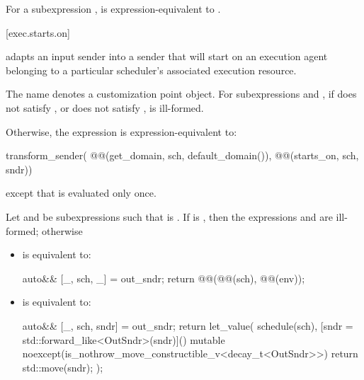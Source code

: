 \pnum
For a subexpression ,
 is expression-equivalent to
.

[exec.starts.on]{}

\pnum
{} adapts an input sender into a sender
that will start on an execution agent belonging to
a particular scheduler's associated execution resource.

\pnum
The name  denotes a customization point object.
For subexpressions  and ,
if  does not satisfy , or
 does not satisfy ,
 is ill-formed.

\pnum
Otherwise,
the expression  is expression-equivalent to:
\begin{codeblock}
transform_sender(
  @@(get_domain, sch, default_domain()),
  @@(starts_on, sch, sndr))
\end{codeblock}
except that  is evaluated only once.

\pnum
Let  and  be subexpressions
such that  is .
If  is ,
then the expressions  and\linebreak
{} are ill-formed; otherwise
\begin{itemize}
\item
{} is equivalent to:
\begin{codeblock}
auto&& [_, sch, _] = out_sndr;
return @@(@@(sch), @@(env));
\end{codeblock}
\item
{} is equivalent to:
\begin{codeblock}
auto&& [_, sch, sndr] = out_sndr;
return let_value(
  schedule(sch),
  [sndr = std::forward_like<OutSndr>(sndr)]() mutable
    noexcept(is_nothrow_move_constructible_v<decay_t<OutSndr>>) {
    return std::move(sndr);
  });
\end{codeblock}
\end{itemize}

